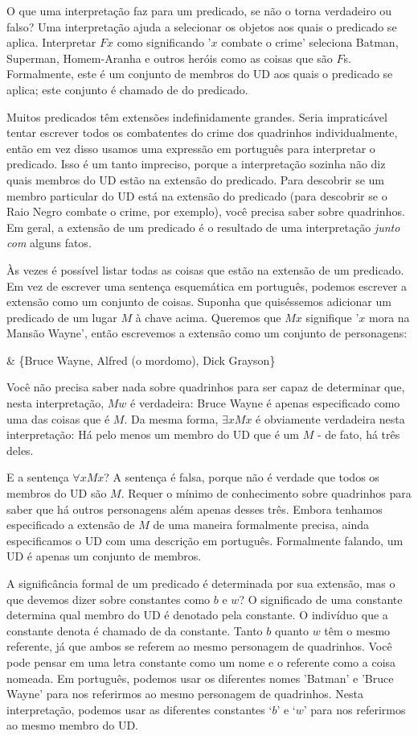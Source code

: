 O que uma interpretação faz para um predicado, se não o torna verdadeiro ou falso? Uma interpretação ajuda a selecionar os objetos aos quais o predicado se aplica. Interpretar $Fx$ como significando '$x$ combate o crime' seleciona Batman, Superman, Homem-Aranha e outros heróis como as coisas que são $F$s. Formalmente, este é um conjunto de membros do UD aos quais o predicado se aplica; este conjunto é chamado de  do predicado.

Muitos predicados têm extensões indefinidamente grandes. Seria impraticável tentar escrever todos os combatentes do crime dos quadrinhos individualmente, então em vez disso usamos uma expressão em português para interpretar o predicado. Isso é um tanto impreciso, porque a interpretação sozinha não diz quais membros do UD estão na extensão do predicado. Para descobrir se um membro particular do UD está na extensão do predicado (para descobrir se o Raio Negro combate o crime, por exemplo), você precisa saber sobre quadrinhos. Em geral, a extensão de um predicado é o resultado de uma interpretação \emph{junto com} alguns fatos.

Às vezes é possível listar todas as coisas que estão na extensão de um predicado. Em vez de escrever uma sentença esquemática em português, podemos escrever a extensão como um conjunto de coisas. Suponha que quiséssemos adicionar um predicado de um lugar $M$ à chave acima. Queremos que $Mx$ signifique '$x$ mora na Mansão Wayne', então escrevemos a extensão como um conjunto de personagens:
\begin{partialmodel}
	 & \{Bruce Wayne, Alfred (o mordomo), Dick Grayson\}
\end{partialmodel}
Você não precisa saber nada sobre quadrinhos para ser capaz de determinar que, nesta interpretação, $Mw$ é verdadeira: Bruce Wayne é apenas especificado como uma das coisas que é $M$. Da mesma forma, $\exists x Mx$ é obviamente verdadeira nesta interpretação: Há pelo menos um membro do UD que é um $M$ - de fato, há três deles.

E a sentença $\forall x  Mx$? A sentença é falsa, porque não é verdade que todos os membros do UD são $M$. Requer o mínimo de conhecimento sobre quadrinhos para saber que há outros personagens além apenas desses três. Embora tenhamos especificado a extensão de $M$ de uma maneira formalmente precisa, ainda especificamos o UD com uma descrição em português. Formalmente falando, um UD é apenas um conjunto de membros.

A significância formal de um predicado é determinada por sua extensão, mas o que devemos dizer sobre constantes como $b$ e $w$? O significado de uma constante determina qual membro do UD é denotado pela constante. O indivíduo que a constante denota é chamado de  da constante. Tanto $b$ quanto $w$ têm o mesmo referente, já que ambos se referem ao mesmo personagem de quadrinhos. Você pode pensar em uma letra constante como um nome e o referente como a coisa nomeada. Em português, podemos usar os diferentes nomes 'Batman' e 'Bruce Wayne' para nos referirmos ao mesmo personagem de quadrinhos. Nesta interpretação, podemos usar as diferentes constantes `$b$' e `$w$' para nos referirmos ao mesmo membro do UD.

